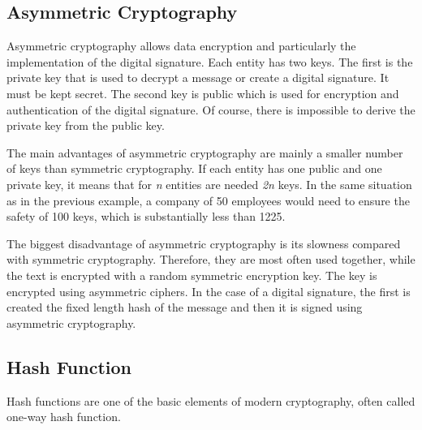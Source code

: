 \documentclass[
  digital, %
  notable,   %
  lof,     %
  lot,     %
]{fithesis3}
\begin{document}
\subsection{Asymmetric Cryptography}
Asymmetric cryptography allows data encryption and particularly the implementation of the 
digital signature. Each entity has two keys. The first is the private key that is used to 
decrypt a message or create a digital signature. It must be kept secret. The second key is 
public which is used for encryption and authentication of the digital signature. Of course, 
there is impossible to derive the private key from the public key.

The main advantages of asymmetric cryptography are mainly a smaller number of keys than 
symmetric cryptography. If each entity has one public and one private key, it means that for 
\textit{n} entities are needed \textit{2n} keys. In the same situation as in the previous 
example, a company of 50 employees would need to ensure the safety of 100 keys, which is 
substantially less than 1225.

The biggest disadvantage of asymmetric cryptography is its slowness compared with symmetric 
cryptography. Therefore, they are most often used together, while the text is encrypted with a 
random symmetric encryption key. The key is encrypted using asymmetric ciphers. In the case of 
a digital signature, the first is created the fixed length hash of the message and then it is 
signed using asymmetric cryptography.

\subsection{Hash Function}
Hash functions are one of the basic elements of modern cryptography, often called one-way 
hash function.
\end{document}
